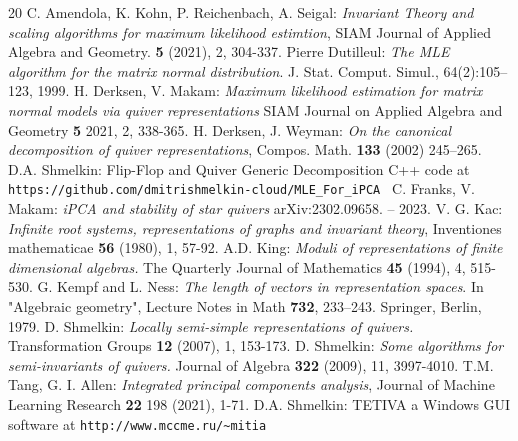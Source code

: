 \documentclass[reqno]{amsart}
\theoremstyle{plain}
\theoremstyle{definition}
\theoremstyle{remark}
\begin{document}
\begin{thebibliography}{20}
 C. Amendola, K. Kohn, P. Reichenbach, A. Seigal: {\it Invariant Theory and scaling algorithms for maximum likelihood estimtion}, SIAM Journal of Applied Algebra and Geometry. {\bf 5} (2021), 2, 304-337.
 Pierre Dutilleul: {\it The MLE algorithm for the matrix normal distribution}. J. Stat. Comput. Simul., 64(2):105–123, 1999.
 H. Derksen, V. Makam: {\it Maximum likelihood estimation for matrix normal models via quiver representations} SIAM Journal on Applied Algebra and Geometry {\bf 5} 2021, 2, 338-365.
 H. Derksen, J. Weyman: {\it On the canonical decomposition of quiver representations}, Compos. Math. {\bf 133} (2002) 245–265.
 D.A. Shmelkin: Flip-Flop and Quiver Generic Decomposition  C++ code at
\verb| https://github.com/dmitrishmelkin-cloud/MLE_For_iPCA |
 C. Franks, V. Makam: {\it iPCA and stability of star quivers} arXiv:2302.09658. – 2023.
 V. G. Kac: {\it Infinite root systems, representations of graphs and invariant theory}, Inventiones mathematicae {\bf 56} (1980), 1, 57-92.
 A.D. King: {\it Moduli of representations of finite dimensional algebras.} The Quarterly Journal of Mathematics {\bf 45} (1994), 4, 515-530.
 G. Kempf and L. Ness: {\it The length of vectors in representation spaces}. In "Algebraic geometry",  Lecture Notes in Math {\bf 732}, 233–243. Springer, Berlin, 1979.
 D. Shmelkin: {\it Locally semi-simple representations of quivers.} Transformation Groups {\bf 12} (2007), 1, 153-173.
 D. Shmelkin: {\it Some algorithms for semi-invariants of quivers.} Journal of Algebra {\bf 322} (2009), 11, 3997-4010.
  T.M. Tang,  G. I. Allen: {\it Integrated principal components analysis}, Journal of Machine Learning Research {\bf 22} 198 (2021), 1-71.
 D.A. Shmelkin: TETIVA a Windows GUI software  at \verb|http://www.mccme.ru/~mitia |
\end{thebibliography}
\end{document}
